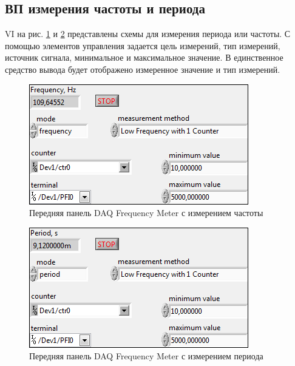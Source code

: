 \documentclass[a4paper,14pt]{article}
\begin{document}
\subsection{ВП измерения частоты и периода}

VI на рис. \ref{img:dfm_freq_vi} и \ref{img:dfm_period_vi} представлены схемы для измерения периода или частоты.
С помощью элементов управления задается цель измерений, тип измерений, источник сигнала, минимальное и максимальное значение.
В единственное средство вывода будет отображено измеренное значение и тип измерений.

\begin{figure}[H]
	\centering
	\includegraphics[width=\linewidth]{image/dfm_freq_vi}
	\caption{Передняя панель DAQ Frequency Meter с измерением частоты}\label{img:dfm_freq_vi}
\end{figure}

\begin{figure}[H]
	\centering
	\includegraphics[width=\linewidth]{image/dfm_period_vi}
	\caption{Передняя панель DAQ Frequency Meter с измерением периода}\label{img:dfm_period_vi}
\end{figure}
\end{document}
